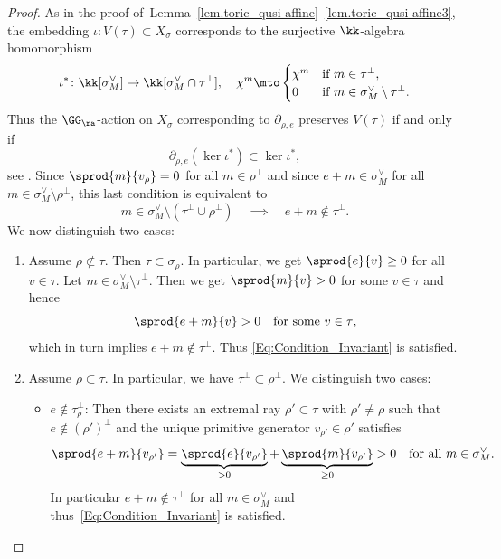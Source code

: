 \begin{proof}
As in the proof of~Lemma~\ref{lem.toric_qusi-affine}~\eqref{lem.toric_qusi-affine3},
the embedding
$\iota \colon V(\tau) \subset X_\sigma$ corresponds to the surjective $\kk$-algebra homomorphism
\[
\iota^\ast \colon \kk[\sigma^{\vee}_M] \to \kk[\sigma^{\vee}_M \cap \tau^{\bot}],
\quad
\chi^m \mto \begin{cases}
\chi^m & \textrm{if $m \in \tau^{\bot}$}, \\
0 & \textrm{if $m \in \sigma_M^\vee \setminus \tau^\bot$}.
\end{cases}
\]
Thus the $\GG_\ra$-action on $X_\sigma$ corresponding to $\partial_{\rho, e}$
preserves $V(\tau)$ if and only
if
\[
\partial_{\rho, e}(\ker \iota^\ast) \subset \ker \iota^\ast,
\]
see \cite[\S 1.5]{Fr2017Algebraic-theory-o}.
Since $\sprod{m}{v_\rho} = 0$ for all $m \in \rho^\bot$
and since $e + m \in \sigma^\vee_M$ for all $m \in \sigma^\vee_M \setminus \rho^\bot$,
this last condition is equivalent to
\[
\label{Eq:Condition_Invariant}
\tag{$\odot$}
m \in \sigma_M^\vee \setminus (\tau^\bot \cup \rho^\bot) \quad \implies \quad
e+m \not\in \tau^\bot.
\]
We now distinguish two cases:
\begin{enumerate}
\item Assume $\rho \not\subset \tau$. Then $\tau \subset \sigma_\rho$. In particular, we
get $\sprod{e}{v} \geq 0$ for all $v \in \tau$.
Let $m \in \sigma_M^\vee \setminus \tau^\bot$. Then
we get $\sprod{m}{v} > 0$ for some $v \in \tau$ and hence
\[
\sprod{e+m}{v} > 0 \quad \textrm{for some $v \in \tau$},
\]
which in turn implies $e + m \not\in \tau^\bot$. Thus
\eqref{Eq:Condition_Invariant} is satisfied.
\item Assume $\rho \subset \tau$. In particular, we have $\tau^\bot \subset \rho^\bot$.
We distinguish two cases:
\begin{itemize}
\item $e \not\in \tau_{\rho}^\bot$: Then there exists an
extremal ray $\rho' \subset \tau$ with $\rho' \neq \rho$ such that $e \not\in (\rho')^\bot$ and
the unique primitive generator
$v_{\rho'} \in \rho'$ satisfies
\[
\sprod{e+m}{v_{\rho'}} = \underbrace{\sprod{e}{v_{\rho'}}}_{>0} + \underbrace{\sprod{m}{v_{\rho'}}}_{\geq 0}
> 0 \quad \textrm{for all $m \in \sigma_M^\vee$}.
\]
In particular $e+m \not\in \tau^\bot$
for all $m \in \sigma_M^\vee$ and thus~\eqref{Eq:Condition_Invariant} is satisfied.


\end{itemize}
\end{enumerate}
\end{proof}

